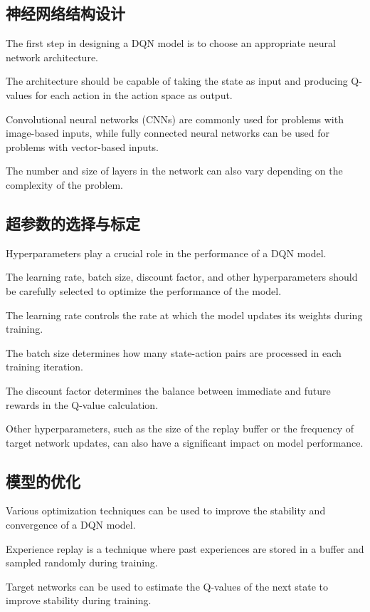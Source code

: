 \subsection{神经网络结构设计}

The first step in designing a DQN model is to choose an appropriate neural network architecture.

The architecture should be capable of taking the state as input and producing Q-values for each action in the action space as output.

Convolutional neural networks (CNNs) are commonly used for problems with image-based inputs, while fully connected neural networks can be used for problems with vector-based inputs.

The number and size of layers in the network can also vary depending on the complexity of the problem.

\subsection{超参数的选择与标定}

Hyperparameters play a crucial role in the performance of a DQN model.

The learning rate, batch size, discount factor, and other hyperparameters should be carefully selected to optimize the performance of the model.

The learning rate controls the rate at which the model updates its weights during training.

The batch size determines how many state-action pairs are processed in each training iteration.

The discount factor determines the balance between immediate and future rewards in the Q-value calculation.

Other hyperparameters, such as the size of the replay buffer or the frequency of target network updates, can also have a significant impact on model performance.

\subsection{模型的优化}

Various optimization techniques can be used to improve the stability and convergence of a DQN model.

Experience replay is a technique where past experiences are stored in a buffer and sampled randomly during training.

Target networks can be used to estimate the Q-values of the next state to improve stability during training.

